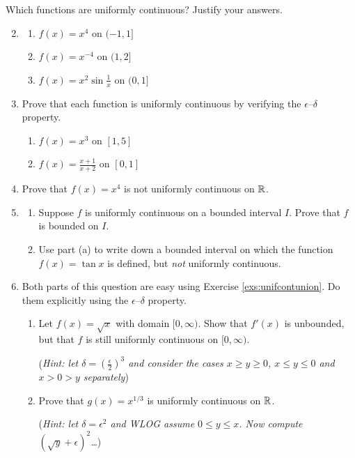 \begin{exercises}
	\exstart Which functions are uniformly continuous? Justify your answers.\vspace{-5pt}
	\begin{enumerate}\setcounter{enumi}{1}  
	  \item[]\begin{enumerate}
	    \item {}
	    $f(x)=x^4$ on $(-1,1]$
	    \setcounter{enumii}{2}
	    \item \makebox[200pt][l]{$f(x)=x^{-4}$ on $(0,2]$\hfill (d) }
	    $f(x)=x^{-4}$ on $(1,2]$
	    \setcounter{enumii}{4}
	    \item $f(x)=x^2\sin\frac 1x$ on $(0,1]$
	  \end{enumerate}
	  
	  
	  \item Prove that each function is uniformly continuous by verifying the $\epsilon$--$\delta$ property.
	  \begin{enumerate}
	    \item {}
	    $f(x)=x^3$ on $[1,5]$
	    \setcounter{enumii}{2}
	    \item {}
	    $f(x)=\frac{x+1}{x+2}$ on $[0,1]$
	  \end{enumerate}
	  
	  
	  \item Prove that $f(x)=x^4$ is not uniformly continuous on $\mathbb{R}$.
	  
	  
	  \item\begin{enumerate}
	     \item Suppose $f$ is uniformly continuous on a bounded interval $I$. Prove that $f$ is bounded on $I$.
	     \item Use part (a) to write down a bounded interval on which the function $f(x)=\tan x$ is defined, but \emph{not} uniformly continuous.
	  \end{enumerate}
	
	
	  \item\label{exs:unifroots} Both parts of this question are easy using Exercise \ref{exs:unifcontunion}. Do them explicitly using the $\epsilon$--$\delta$ property.
	  \begin{enumerate}
	    \item Let $f(x)=\sqrt x$ with domain $[0,\infty)$. Show that $f'(x)$ is unbounded, but that $f$ is still uniformly continuous on $[0,\infty)$.\par
	    (\emph{Hint: let $\delta=(\frac\epsilon 2)^3$ and consider the cases $x\ge y\ge 0$, $x\le y\le 0$ and $x>0>y$ separately})
	    \item Prove that $g(x)=x^{1/3}$ is uniformly continuous on $\mathbb{R}$.\par
	    (\emph{Hint: let $\delta=\epsilon^2$ and WLOG assume $0\le y\le x$. Now compute $(\sqrt y+\epsilon)^2$\ldots })
	  \end{enumerate}



\end{enumerate}
\end{exercises}
